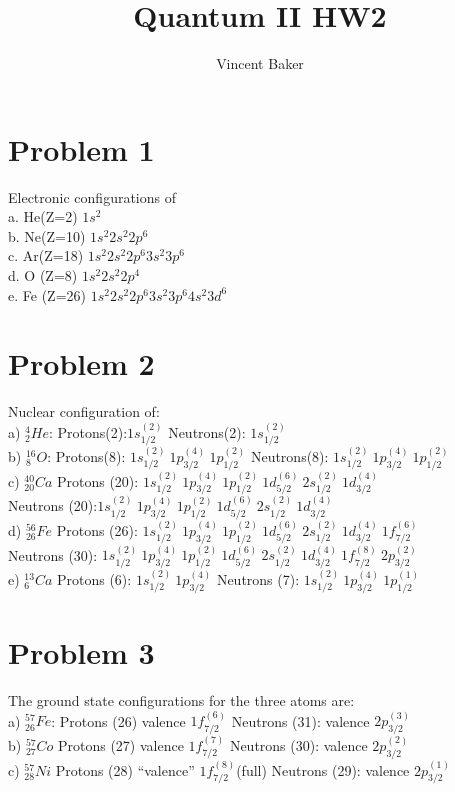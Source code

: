 \documentclass[a4paper,12pt]{article}
\title{Quantum II HW2}
\author{Vincent Baker}
\numberwithin{equation}{section}
\begin{document}
\maketitle

\section{Problem 1}

Electronic configurations of \\
a. He(Z=2) $1s^2$ \\
b. Ne(Z=10) $1s^2 2s^2 2p^6$\\
c. Ar(Z=18) $1s^2 2s^2 2p^6 3s^2 3p^6$ \\
d. O (Z=8) $1s^2 2s^2 2p^4$ \\
e. Fe (Z=26) $1s^2 2s^2 2p^6 3s^2 3p^6 4s^2 3d^6 $\\

\section{Problem 2}
Nuclear configuration of:\\
a) $^4_2He$: Protons(2):$1s_{1/2}^{(2)}$  Neutrons(2): $1s_{1/2}^{(2)}$ \\
b) $^{16}_8O$: Protons(8): $1s_{1/2}^{(2)}\ 1p_{3/2}^{(4)}\ 1p_{1/2}^{(2)}$  Neutrons(8): $1s_{1/2}^{(2)}\ 1p_{3/2}^{(4)}\ 1p_{1/2}^{(2)}$ \\
c) $^{40}_{20}Ca$ Protons (20): $1s_{1/2}^{(2)}\ 1p_{3/2}^{(4)}\ 1p_{1/2}^{(2)}\ 1d_{5/2}^{(6)}\ 2s_{1/2}^{(2)}\ 1d_{3/2}^{(4)} $  
\\ Neutrons (20):$1s_{1/2}^{(2)}\ 1p_{3/2}^{(4)}\ 1p_{1/2}^{(2)}\ 1d_{5/2}^{(6)}\ 2s_{1/2}^{(2)}\ 1d_{3/2}^{(4)} $ \\
d) $^{56}_{26}Fe$ Protons (26): $1s_{1/2}^{(2)}\ 1p_{3/2}^{(4)}\ 1p_{1/2}^{(2)}\ 1d_{5/2}^{(6)}\ 2s_{1/2}^{(2)}\ 1d_{3/2}^{(4)}\ 1f_{7/2}^{(6)} $  
   \\ Neutrons (30): $1s_{1/2}^{(2)}\ 1p_{3/2}^{(4)}\ 1p_{1/2}^{(2)}\ 1d_{5/2}^{(6)}\ 2s_{1/2}^{(2)}\ 1d_{3/2}^{(4)}\ 1f_{7/2}^{(8)}\ 2p_{3/2}^{(2)} $\\
e) $^{13}_6Ca $ Protons (6): $1s_{1/2}^{(2)}\ 1p_{3/2}^{(4)} $ Neutrons (7): $1s_{1/2}^{(2)}\ 1p_{3/2}^{(4)}\ 1p_{1/2}^{(1)} $

\section{Problem 3}
The ground state configurations for the three atoms are:\\
a) $^{57}_{26}Fe$: Protons (26) valence $1f_{7/2}^{(6)}$ Neutrons (31): valence $2p_{3/2}^{(3)}$ \\
b) $^{57}_{27}Co$  Protons (27) valence $1f_{7/2}^{(7)}$ Neutrons (30): valence $2p_{3/2}^{(2)}$\\
c) $^{57}_{28}Ni$  Protons (28) ``valence'' $1f_{7/2}^{(8)}$(full) Neutrons (29): valence $2p_{3/2}^{(1)}$
\end{document}
